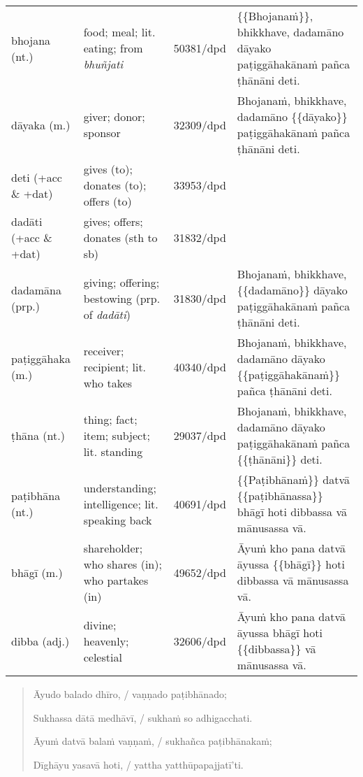 \documentclass[11pt,oneside]{memoir}
\begin{document}
\begin{longtable}{L{\colOne} L{\colTwo} H H}
bhojana (nt.) & food; meal; lit. eating; from \emph{bhuñjati} & 50381/dpd & \{\{Bhojanaṁ\}\}, bhikkhave, dadamāno dāyako paṭiggāhakānaṁ pañca ṭhānāni deti.\\[0pt]
dāyaka (m.) & giver; donor; sponsor & 32309/dpd & Bhojanaṁ, bhikkhave, dadamāno \{\{dāyako\}\} paṭiggāhakānaṁ pañca ṭhānāni deti.\\[0pt]
deti (+acc \& +dat) & gives (to); donates (to); offers (to) & 33953/dpd & \\[0pt]
dadāti  (+acc \& +dat) & gives; offers; donates (sth to sb) & 31832/dpd & \\[0pt]
dadamāna (prp.) & giving; offering; bestowing (prp. of \emph{dadāti}) & 31830/dpd & Bhojanaṁ, bhikkhave, \{\{dadamāno\}\} dāyako paṭiggāhakānaṁ pañca ṭhānāni deti.\\[0pt]
paṭiggāhaka (m.) & receiver; recipient; lit. who takes & 40340/dpd & Bhojanaṁ, bhikkhave, dadamāno dāyako \{\{paṭiggāhakānaṁ\}\} pañca ṭhānāni deti.\\[0pt]
ṭhāna (nt.) & thing; fact; item; subject; lit. standing & 29037/dpd & Bhojanaṁ, bhikkhave, dadamāno dāyako paṭiggāhakānaṁ pañca \{\{ṭhānāni\}\} deti.\\[0pt]
paṭibhāna (nt.) & understanding; intelligence;  lit. speaking back & 40691/dpd & \{\{Paṭibhānaṁ\}\} datvā \{\{paṭibhānassa\}\} bhāgī hoti dibbassa vā mānusassa vā.\\[0pt]
bhāgī (m.) & shareholder; who shares (in); who partakes (in) & 49652/dpd & Āyuṁ kho pana datvā āyussa \{\{bhāgī\}\} hoti dibbassa vā mānusassa vā.\\[0pt]
dibba (adj.) & divine; heavenly; celestial & 32606/dpd & Āyuṁ kho pana datvā āyussa bhāgī hoti \{\{dibbassa\}\} vā mānusassa vā.\\[0pt]
\end{longtable}

\clearpage
\casesLegendHeaderBGHere

\begin{quote}
Āyudo balado dhīro, / vaṇṇado paṭibhānado;

Sukhassa dātā medhāvī, / sukhaṁ so adhigacchati.

Āyuṁ datvā balaṁ vaṇṇaṁ, / sukhañca paṭibhānakaṁ;

Dīghāyu yasavā hoti, / yattha yatthūpapajjatī'ti.
\end{quote}
\end{document}
